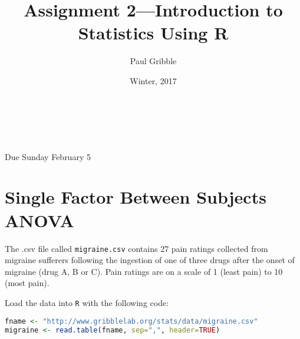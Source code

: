 \documentclass[10pt]{article}
\title{Assignment 2---Introduction to Statistics Using R}
\author{Paul Gribble}
\date{Winter, 2017}
\makeatletter
\renewcommand{\maketitle}{
\begin{flushleft}          %
{\Large\sffamily\bfseries\@title}   %
\vspace{3ex}\\            %
{\normalsize\sffamily\@author}           %
\vspace{0ex}\\             %
\normalsize\sffamily\@date                     %
\vspace{5ex}              %
\end{flushleft}
}
\makeatother
\begin{document}
\maketitle

\thispagestyle{empty}

{\flushleft \sffamily * Due Sunday February 5}

\section{Single Factor Between Subjects ANOVA}

The .csv file called \texttt{migraine.csv} contains 27 pain ratings
collected from migraine sufferers following the ingestion of one of
three drugs after the onset of migraine (drug A, B or C). Pain ratings
are on a scale of 1 (least pain) to 10 (most pain).

Load the data into \texttt{R} with the following code:

\begin{lstlisting}[language=R]
fname <- "http://www.gribblelab.org/stats/data/migraine.csv"
migraine <- read.table(fname, sep=",", header=TRUE)
\end{lstlisting}
\end{document}
